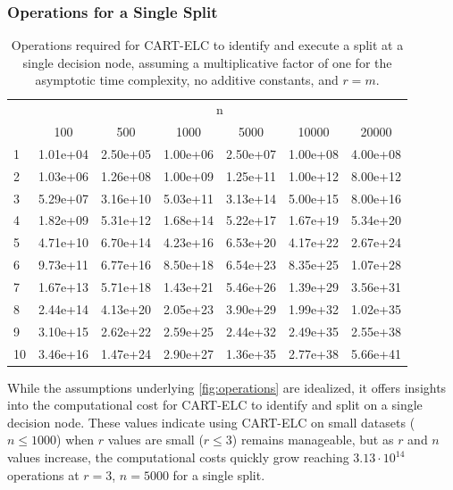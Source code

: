 \documentclass[10pt]{article} %
\begin{document}
\subsubsection{Operations for a Single Split}\label{ops}

\begin{table}[h]
	\centering
    \caption{Operations required for CART-ELC to identify and execute a split at a single decision node, assuming a multiplicative factor of one for the asymptotic time complexity, no additive constants, and $r = m$.}
	\small
	\begin{tabular}{lcccccc} 
		\addlinespace
		\toprule
		\multirow{2}{*}{r} & \multicolumn{6}{c}{n}  \\ 
		\cmidrule(lr){2-7}  
		& 100 & 500 & 1000 & 5000 & 10000 & 20000 \\ 
		\midrule
			1 & 1.01e+04 & 2.50e+05 & 1.00e+06 & 2.50e+07 & 1.00e+08 & 4.00e+08 \\
			2 & 1.03e+06 & 1.26e+08 & 1.00e+09 & 1.25e+11 & 1.00e+12 & 8.00e+12 \\
			3 & 5.29e+07 & 3.16e+10 & 5.03e+11 & 3.13e+14 & 5.00e+15 & 8.00e+16 \\
			4 & 1.82e+09 & 5.31e+12 & 1.68e+14 & 5.22e+17 & 1.67e+19 & 5.34e+20 \\
			5 & 4.71e+10 & 6.70e+14 & 4.23e+16 & 6.53e+20 & 4.17e+22 & 2.67e+24 \\
			6 & 9.73e+11 & 6.77e+16 & 8.50e+18 & 6.54e+23 & 8.35e+25 & 1.07e+28 \\
			7 & 1.67e+13 & 5.71e+18 & 1.43e+21 & 5.46e+26 & 1.39e+29 & 3.56e+31 \\
			8 & 2.44e+14 & 4.13e+20 & 2.05e+23 & 3.90e+29 & 1.99e+32 & 1.02e+35 \\
			9 & 3.10e+15 & 2.62e+22 & 2.59e+25 & 2.44e+32 & 2.49e+35 & 2.55e+38 \\
			10 & 3.46e+16 & 1.47e+24 & 2.90e+27 & 1.36e+35 & 2.77e+38 & 5.66e+41 \\
		\bottomrule
	\end{tabular}
	\label{fig:operations}
\end{table}

While the assumptions underlying \autoref{fig:operations} are idealized, it offers insights into the computational cost for CART-ELC to identify and split on a single decision node. These values indicate using CART-ELC on small datasets ($n \leq 1000$) when $r$ values are small ($r \leq 3$) remains manageable, but as $r$ and $n$ values increase, the computational costs quickly grow reaching $3.13 \cdot 10^{14}$ operations at $r = 3$, $n = 5000$ for a single split. 
\end{document}
